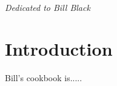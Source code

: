 \documentclass{tufte-book}
\begin{document}
\cleardoublepage
\tableofcontents


\cleardoublepage
~\vfill
\begin{doublespace}
\noindent\fontsize{18}{22}\selectfont\itshape
\nohyphenation
Dedicated to Bill Black
\end{doublespace}
\vfill
\vfill


\cleardoublepage
\chapter*{Introduction}

Bill's cookbook is.....


\mainmatter
\end{document}
